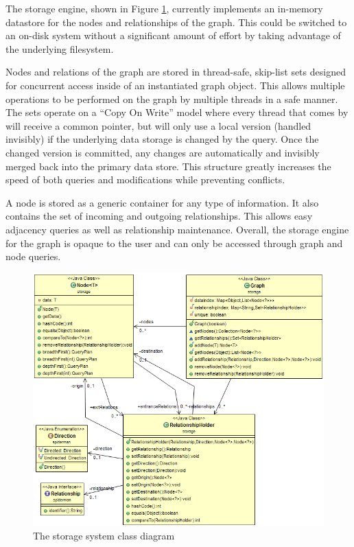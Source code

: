 \documentclass[11pt]{article}
\begin{document}
The storage engine, shown in Figure \ref{fig:storage}, currently implements an in-memory datastore for the nodes and relationships of the graph. This could be switched to an on-disk system without a significant amount of effort by taking advantage of the underlying filesystem.

Nodes and relations of the graph are stored in thread-safe, skip-list sets designed for concurrent access inside of an instantiated graph object. This allows multiple operations to be performed on the graph by multiple threads in a safe manner. The sets operate on a “Copy On Write” model where every thread that comes by will receive a common pointer, but will only use a local version (handled invisibly) if the underlying data storage is changed by the query. Once the changed version is committed, any changes are automatically and invisibly merged back into the primary data store. This structure greatly increases the speed of both queries and modifications while preventing conflicts.

A node is stored as a generic container for any type of information. It also contains the set of incoming and outgoing relationships. This allows easy adjacency queries as well as relationship maintenance. Overall, the storage engine for the graph is opaque to the user and can only be accessed through graph and node queries.

\begin{figure}[H]
\centering
\includegraphics[scale=0.65]{uml.png}
\caption{The storage system class diagram}
\label{fig:storage}
\end{figure}
\end{document}
